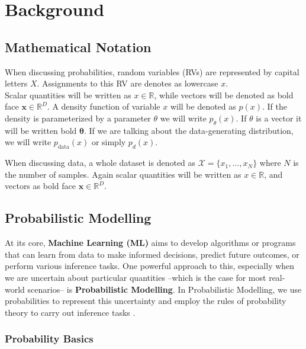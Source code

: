 \usetikzlibrary{calc}

\renewcommand{\vec}[1]{\textbf{#1}}
\newcommand{\norm}[1]{\left\lVert#1\right\rVert}


\chapter{Background}
\label{cha:background}

\section{Mathematical Notation}

When discussing probabilities, random variables (RVs) are represented by capital letters $X$. Assignments to this RV are denotes as lowercase $x$. \\ 
Scalar quantities will be written as $x \in \mathbb{R}$, while vectors will be denoted as bold face $\vec x \in \mathbb{R}^D$.
A density function of variable $x$ will be denoted as $p(x)$. If the density is parameterized by a parameter $\theta$ we will write 
$p_\theta(x)$. If $\theta$ is a vector it will be written bold $\boldsymbol{\theta}$.
If we are talking about the data-generating distribution, we will write $p_{\text{data}}(x)$ or simply $p_d(x)$.

When discussing data, a whole dataset is denoted as $\mathcal{X} = \{x_1, ... , x_N\}$ where $N$ is the number of samples. 
Again scalar quantities will be written as $x \in \mathbb{R}$, and vectors as bold face $\vec x \in \mathbb{R}^D$.

\section{Probabilistic Modelling}
\label{sec:pm}

At its core, \textbf{Machine Learning (ML)} aims to develop algorithms or programs that can learn from data to make informed decisions, predict future outcomes, or perform various inference tasks. 
One powerful approach to this, especially when we are uncertain about particular quantities
--which is the case for most real-world scenarios-- is \textbf{Probabilistic Modelling}.
In Probabilistic Modelling, we use probabilities to represent this uncertainty and employ the rules of probability theory to carry out inference tasks \cite{pc_intro}.

\subsection{Probability Basics}
\label{sec:prob_basics}

